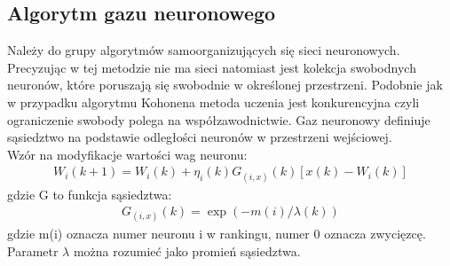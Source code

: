 \documentclass{classrep}
\begin{document}
{\subsection{Algorytm gazu neuronowego}
{
Należy do grupy algorytmów samoorganizujących się sieci neuronowych. Precyzując w tej metodzie nie ma sieci natomiast jest kolekcja swobodnych neuronów, które poruszają się swobodnie w określonej przestrzeni. Podobnie jak w przypadku algorytmu Kohonena metoda uczenia jest konkurencyjna czyli ograniczenie swobody polega na współzawodnictwie. Gaz neuronowy definiuje sąsiedztwo na podstawie odległości neuronów w przestrzeni wejściowej. \\

Wzór na modyfikacje wartości wag neuronu:
\begin{align*}
W_i(k+1)=W_i(k)+\eta_i(k)G_{(i,x)}(k)[x(k)-W_i(k)]
\end{align*}
gdzie G to funkcja sąsiedztwa:
\begin{align*}
G_{(i,x)}(k)=\exp(-m(i)/\lambda(k))
\end{align*}
gdzie m(i) oznacza numer neuronu i w rankingu, numer 0 oznacza zwycięzcę.\\
Parametr $\lambda$ można rozumieć jako promień sąsiedztwa.
}
}
\end{document}

